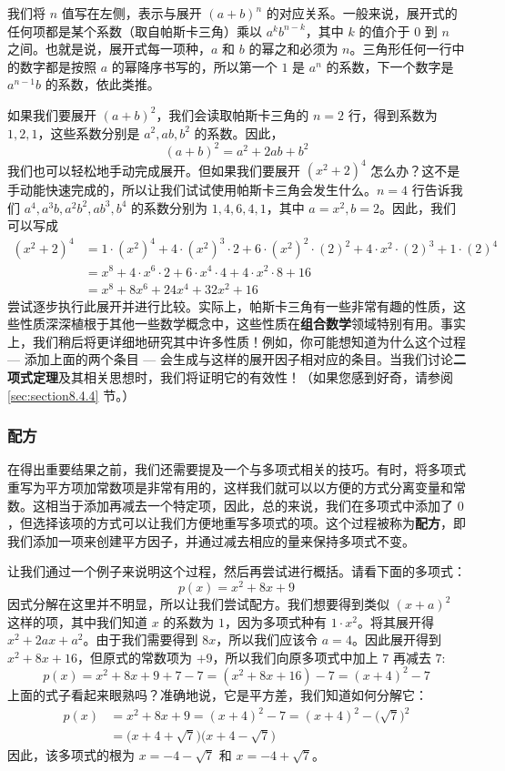 我们将 $n$ 值写在左侧，表示与展开 $(a+b)^n$ 的对应关系。一般来说，展开式的任何项都是某个系数（取自帕斯卡三角）乘以 $a^kb^{n-k}$，其中 $k$ 的值介于 $0$ 到 $n$ 之间。也就是说，展开式每一项种，$a$ 和 $b$ 的幂之和必须为 $n$。三角形任何一行中的数字都是按照 $a$ 的幂降序书写的，所以第一个 $1$ 是 $a^n$ 的系数，下一个数字是 $a^{n-1}b$ 的系数，依此类推。

如果我们要展开 $(a + b)^2$，我们会读取帕斯卡三角的 $n = 2$ 行，得到系数为 $1, 2, 1$，这些系数分别是 $a^2, ab, b^2$ 的系数。因此，
\[(a + b)^2 = a^2 + 2ab + b^2\]
我们也可以轻松地手动完成展开。但如果我们要展开 $(x^2+2)^4$ 怎么办？这不是手动能快速完成的，所以让我们试试使用帕斯卡三角会发生什么。$n = 4$ 行告诉我们 $a^4, a^3b, a^2b^2, ab^3, b^4$ 的系数分别为 $1, 4, 6, 4, 1$，其中 $a = x^2, b = 2$。因此，我们可以写成
\begin{align*}
    (x^2+2)^4 &=  1 \cdot (x^2)^4 + 4 \cdot (x^2)^3 \cdot 2 + 6 \cdot (x^2)^2 \cdot (2)^2 + 4 \cdot x^2 \cdot (2)^3 + 1 \cdot (2)^4 \\
    &=  x^8 + 4 \cdot x^6 \cdot 2 + 6 \cdot x^4 \cdot 4 + 4 \cdot x^2 \cdot 8 + 16 \\
    &= x^8 + 8x^6 + 24x^4 + 32x^2 + 16
\end{align*}
尝试逐步执行此展开并进行比较。实际上，帕斯卡三角有一些非常有趣的性质，这些性质深深植根于其他一些数学概念中，这些性质在\textbf{组合数学}领域特别有用。事实上，我们稍后将更详细地研究其中许多性质！例如，你可能想知道为什么这个过程 --- 添加上面的两个条目 --- 会生成与这样的展开因子相对应的条目。当我们讨论\textbf{二项式定理}及其相关思想时，我们将证明它的有效性！（如果您感到好奇，请参阅 \ref{sec:section8.4.4} 节。）

\subsubsection*{配方}

在得出重要结果之前，我们还需要提及一个与多项式相关的技巧。有时，将多项式重写为平方项加常数项是非常有用的，这样我们就可以以方便的方式分离变量和常数。这相当于添加再减去一个特定项，因此，总的来说，我们在多项式中添加了 $0$，但选择该项的方式可以让我们方便地重写多项式的项。这个过程被称为\textbf{配方}，即我们添加一项来创建平方因子，并通过减去相应的量来保持多项式不变。

让我们通过一个例子来说明这个过程，然后再尝试进行概括。请看下面的多项式：
\[p(x) = x^2 + 8x + 9\]
因式分解在这里并不明显，所以让我们尝试配方。我们想要得到类似 $(x + a)^2$ 这样的项，其中我们知道 $x$ 的系数为 $1$，因为多项式种有 $1 \cdot x^2$。将其展开得 $x^2+2ax+a^2$。由于我们需要得到 $8x$，所以我们应该令 $a = 4$。因此展开得到 $x^2 + 8x + 16$，但原式的常数项为 $+9$，所以我们向原多项式中加上 $7$ 再减去 $7$: 
\[p(x) = x^2 + 8x + 9 + 7 - 7 = (x^2 + 8x + 16) - 7 = (x + 4)^2 - 7\]
上面的式子看起来眼熟吗？准确地说，它是平方差，我们知道如何分解它：
\begin{align*}
    p(x) &= x^2 + 8x + 9 = (x + 4)^2 - 7 = (x + 4)^2 - \Big(\sqrt 7\Big)^2 \\
    &= \Big(x+4+\sqrt 7\Big)\Big(x+4-\sqrt 7\Big)
\end{align*}
因此，该多项式的根为 $x=-4-\sqrt 7$ 和 $x=-4+\sqrt 7$。

